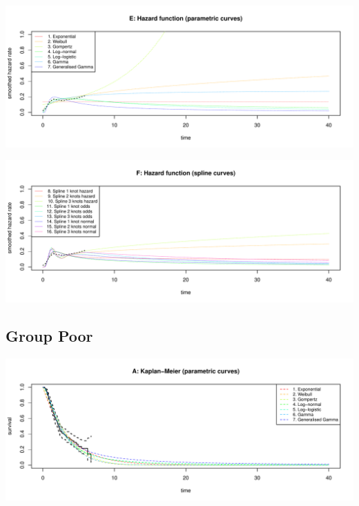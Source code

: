 \documentclass[
]{article}
\begin{document}
\begin{flushleft}\includegraphics[height=0.29\textheight]{Images/validate_extrapolation2-5} \end{flushleft}

\begin{flushleft}\includegraphics[height=0.29\textheight]{Images/validate_extrapolation2-6} \end{flushleft}

\newpage

\hypertarget{group-poor}{%
\subsection{Group Poor}\label{group-poor}}

\begin{flushleft}\includegraphics[height=0.29\textheight]{Images/validate_extrapolation3-1} \end{flushleft}
\end{document}
